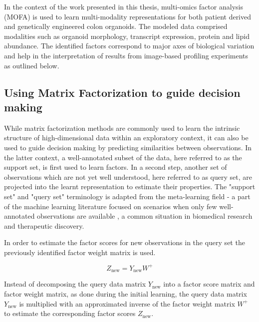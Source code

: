 \begin{flushleft}

In the context of the work presented in this thesis, multi-omics factor analysis (MOFA) is used to learn multi-modality representations for both patient derived and genetically engineered colon organoids. The modeled data comprised modalities such as organoid morphology, transcript expression, protein and lipid abundance. The identified factors correspond to major axes of biological variation and help in the interpretation of results from image-based profiling experiments as outlined below. 

\subsection{Using Matrix Factorization to guide decision making}

While matrix factorization methods are commonly used to learn the intrinsic structure of high-dimensional data within an exploratory context, it can also be used to guide decision making by predicting similarities between observations. In the latter context, a well-annotated subset of the data, here referred to as the support set, is first used to learn factors. In a second step, another set of observations which are not yet well understood, here referred to as query set, are projected into the learnt representation to estimate their properties. The "support set" and "query set" terminology is adapted from the meta-learning field - a part of the machine learning literature focused on scenarios when only few well-annotated observations are available \citep{hospedalesMetaLearningNeuralNetworks2020}, a common situation in biomedical research and therapeutic discovery. 

In order to estimate the factor scores for new observations in the query set the previously identified factor weight matrix is used. 

\begin{equation}
    Z_{\text{new}} = Y_{\text{new}} W^+
\end{equation}

Instead of decomposing the query data matrix \(Y_{\text{new}}\) into a factor score matrix and factor weight matrix, as done during the initial learning, the query data matrix  \(Y_{\text{new}}\) is multiplied with an approximated inverse of the factor weight matrix \( W^+ \) to estimate the corresponding factor scores \( Z_{\text{new}} \). 


\end{flushleft}
